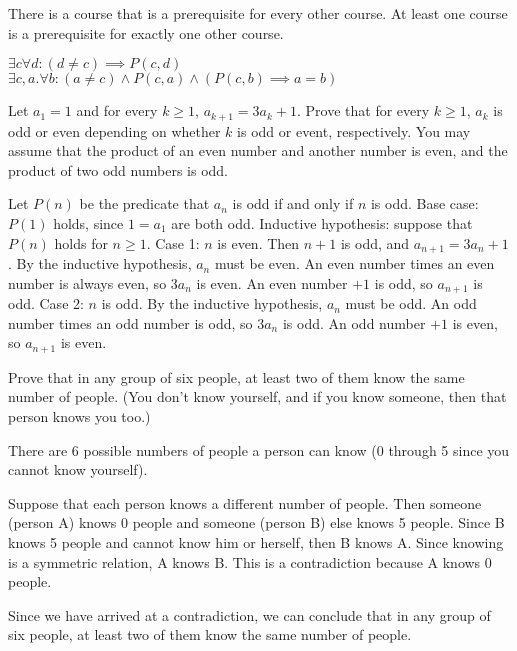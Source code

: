 \documentclass[solution, letterpaper]{cs20exam}
\begin{document}
\subproblem There is a course that is a prerequisite for every other course.
\subproblem At least one course is a prerequisite for exactly one other course.

\begin{solution}
\subsolution $\exists c \forall d: (d \neq c) \implies P(c,d)$
\subsolution $\exists c, a . \forall b : (a \neq c) \land P(c, a) \land (P(c, b) \implies a = b)$

\end{solution}

\problem{}{}
Let $a_1=1$ and for every $k \geq 1$, $a_{k+1}=3a_k+1$. Prove that for every $k \geq1 $, $a_k$ is odd or even depending on whether $k$ is odd or event, respectively. You may assume that the product of an even number and another number is even, and the product of two odd numbers is odd.

\begin{solution}
Let $P(n)$ be the predicate that $a_n$ is odd if and only if $n$ is odd. Base case: $P(1)$ holds, since $1 = a_1$ are both odd. Inductive hypothesis: suppose that $P(n)$ holds for $n \ge 1$. Case 1: $n$ is even. Then $n+1$ is odd, and $a_{n+1} = 3a_n + 1$. By the inductive hypothesis, $a_n$ must be even. An even number times an even number is always even, so $3a_n$ is even. An even number $+1$ is odd, so $a_{n+1}$ is odd. Case 2: $n$ is odd. By the inductive hypothesis, $a_n$ must be odd. An odd number times an odd number is odd, so $3a_n$ is odd. An odd number $+1$ is even, so $a_{n+1}$ is even.
\end{solution}

\problem{}{}
Prove that in any group of six people, at least two of them know the same number of people. (You don't know yourself, and if you know someone, then that person knows you too.)

\begin{solution}

There are 6 possible numbers of people a person can know (0 through 5 since you cannot know yourself).

Suppose that each person knows a different number of people. Then someone (person A) knows 0 people and someone (person B) else knows 5 people. Since B knows 5 people and cannot know him or herself, then B knows A. Since knowing is a symmetric relation, A knows B. This is a contradiction because A knows 0 people.

Since we have arrived at a contradiction, we can conclude that in any group of six people, at least two of them know the same number of people.

\end{solution}
\end{document}
